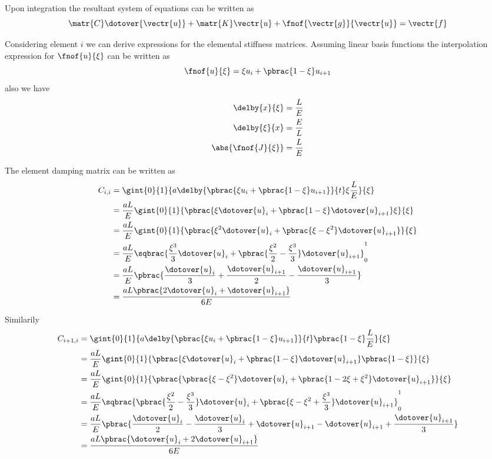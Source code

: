 Upon integration the resultant system of equations can be written as
\begin{equation}
  \matr{C}\dotover{\vectr{u}}+\matr{K}\vectr{u}+\fnof{\vectr{g}}{\vectr{u}}=\vectr{f}
\end{equation}

Considering element $i$ we can derive expressions for the elemental
stiffness matrices. Assuming linear basis functions the interpolation
expression for $\fnof{u}{\xi}$ can be written as
\begin{equation}
  \fnof{u}{\xi}=\xi u_{i}+\pbrac{1-\xi}u_{i+1}
\end{equation}
also we have
\begin{align}
  \delby{x}{\xi}&=\dfrac{L}{E} \\
  \delby{\xi}{x}&=\dfrac{E}{L} \\
  \abs{\fnof{J}{\xi}}&=\dfrac{L}{E}
\end{align}

The element damping matrix can be written as
\begin{align}
  C_{i,i}&=\gint{0}{1}{a\delby{\pbrac{\xi u_{i}+\pbrac{1-\xi}u_{i+1}}}{t}\xi\dfrac{L}{E}}{\xi} \\
  &=\dfrac{aL}{E}\gint{0}{1}{\pbrac{\xi\dotover{u}_{i}+\pbrac{1-\xi}\dotover{u}_{i+1}}\xi}{\xi} \\
  &=\dfrac{aL}{E}\gint{0}{1}{\pbrac{\xi^{2}\dotover{u}_{i}+\pbrac{\xi-\xi^{2}}\dotover{u}_{i+1}}}{\xi} \\
  &=\dfrac{aL}{E}\sqbrac{\dfrac{\xi^{3}}{3}\dotover{u}_{i}+\pbrac{\dfrac{\xi^{2}}{2}-\dfrac{\xi^{3}}{3}}\dotover{u}_{i+1}}_{0}^{1}\\
  &=\dfrac{aL}{E}\pbrac{\dfrac{\dotover{u}_{i}}{3}+\dfrac{\dotover{u}_{i+1}}{2}-\dfrac{\dotover{u}_{i+1}}{3}}\\
  &=\dfrac{aL\pbrac{2\dotover{u}_{i}+\dotover{u}_{i+1}}}{6E}  
\end{align}

Similarily
\begin{align}
  C_{i+1,i}&=\gint{0}{1}{a\delby{\pbrac{\xi u_{i}+\pbrac{1-\xi}u_{i+1}}}{t}\pbrac{1-\xi}\dfrac{L}{E}}{\xi} \\
  &=\dfrac{aL}{E}\gint{0}{1}{\pbrac{\xi\dotover{u}_{i}+\pbrac{1-\xi}\dotover{u}_{i+1}}\pbrac{1-\xi}}{\xi} \\
  &=\dfrac{aL}{E}\gint{0}{1}{\pbrac{\pbrac{\xi-\xi^{2}}\dotover{u}_{i}+\pbrac{1-2\xi+\xi^{2}}\dotover{u}_{i+1}}}{\xi} \\
  &=\dfrac{aL}{E}\sqbrac{\pbrac{\dfrac{\xi^{2}}{2}-\dfrac{\xi^{3}}{3}}\dotover{u}_{i}+\pbrac{\xi-\xi^{2}+
      \dfrac{\xi^{3}}{3}}\dotover{u}_{i+1}}_{0}^{1}\\
  &=\dfrac{aL}{E}\pbrac{\dfrac{\dotover{u}_{i}}{2}-\dfrac{\dotover{u}_{i}}{3}+\dotover{u}_{i+1}-\dotover{u}_{i+1}+
    \dfrac{\dotover{u}_{i+1}}{3}}\\
  &=\dfrac{aL\pbrac{\dotover{u}_{i}+2\dotover{u}_{i+1}}}{6E}  
\end{align}

